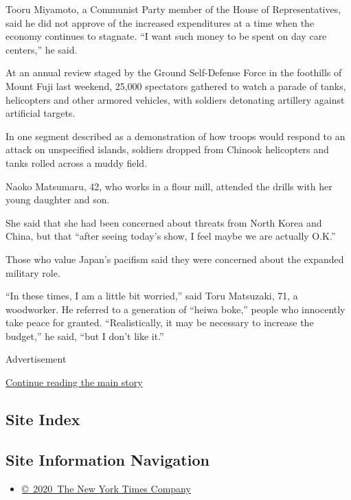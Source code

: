 Tooru Miyamoto, a Communist Party member of the House of
Representatives, said he did not approve of the increased expenditures
at a time when the economy continues to stagnate. ``I want such money to
be spent on day care centers,'' he said.

At an annual review staged by the Ground Self-Defense Force in the
foothills of Mount Fuji last weekend, 25,000 spectators gathered to
watch a parade of tanks, helicopters and other armored vehicles, with
soldiers detonating artillery against artificial targets.

In one segment described as a demonstration of how troops would respond
to an attack on unspecified islands, soldiers dropped from Chinook
helicopters and tanks rolled across a muddy field.

Naoko Matsumaru, 42, who works in a flour mill, attended the drills with
her young daughter and son.

She said that she had been concerned about threats from North Korea and
China, but that ``after seeing today's show, I feel maybe we are
actually O.K.''

Those who value Japan's pacifism said they were concerned about the
expanded military role.

``In these times, I am a little bit worried,'' said Toru Matsuzaki, 71,
a woodworker. He referred to a generation of ``heiwa boke,'' people who
innocently take peace for granted. ``Realistically, it may be necessary
to increase the budget,'' he said, ``but I don't like it.''

Advertisement

\protect\hyperlink{after-bottom}{Continue reading the main story}

\hypertarget{site-index}{%
\subsection{Site Index}\label{site-index}}

\hypertarget{site-information-navigation}{%
\subsection{Site Information
Navigation}\label{site-information-navigation}}

\begin{itemize}
\tightlist
\item
  \href{https://help.nytimes.com/hc/en-us/articles/115014792127-Copyright-notice}{©~2020~The
  New York Times Company}
\end{itemize}

